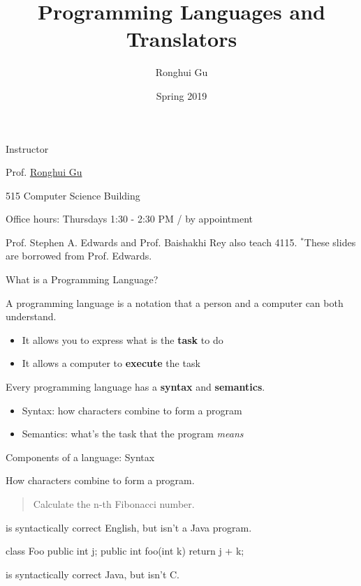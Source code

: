 \documentclass{plt}
\title{Programming Languages and Translators}
\author{Ronghui Gu}
\institute{Columbia University}
\date{Spring 2019}
\begin{document}
\frame{\titlepage}

\begin{frame}{Instructor}

\baselineskip

Prof. \href{http://guronghui.com}{\textcolor{mBlue}{Ronghui Gu}}

515 Computer Science Building



Office hours: Thursdays 1:30 - 2:30 PM / by appointment

\vfill


\vfill
\small{Prof. Stephen A. Edwards and Prof. Baishakhi Rey also teach 4115.}
\small{$^*$These slides are borrowed from Prof. Edwards.}

\end{frame}

\begin{frame}[fragile]{What is a Programming Language?}

A programming language is a notation that  a person and a computer can both understand.
\begin{itemize}

\item It allows you to express what is the \textbf{task} to do

\item It allows a computer to \textbf{execute} the task

\end{itemize}


Every  programming language has a \textbf{syntax} and \textbf{semantics}.
\begin{itemize}

\item Syntax: how characters combine to form a program

\item Semantics: what's the task that the program \emph{means}

\end{itemize}

\end{frame}


\begin{frame}[fragile]{Components of a language: Syntax}

\alert{How characters combine to form a program.}

\begin{quote}
Calculate the n-th Fibonacci number.
\end{quote}

is syntactically correct English, but isn't a Java program.

\begin{java}
class Foo {
  public int j;
  public int foo(int k) { return j + k; }
}
\end{java}

is syntactically correct Java, but isn't C.

\end{frame}
\end{document}
